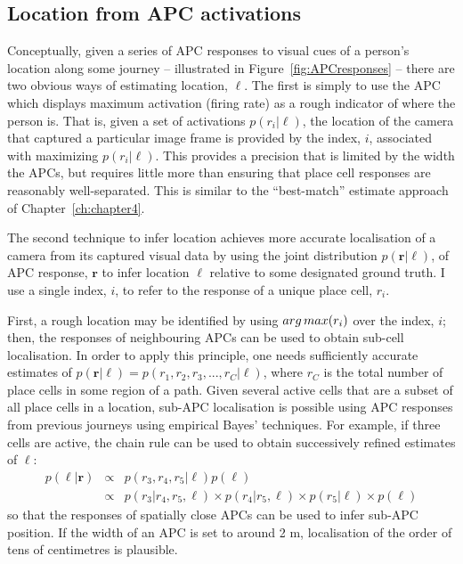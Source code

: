 \subsection{Location from APC activations}
Conceptually, given a series of APC responses to visual cues of a person's location along some journey -- illustrated in Figure~\ref{fig:APCresponses} -- there are two obvious ways of estimating location, $\ell$.  The first is simply to use the APC which displays maximum activation (firing rate) as a rough indicator of where the person is. That is, given a set of activations $p(r_i|\ell)$, the location of the camera that captured a particular image frame is provided by the index, $i$, associated with maximizing $p(r_i|\ell)$. This provides a precision that is limited by the width the APCs, but requires little more than ensuring that place cell responses are reasonably well-separated. This is similar to the ``best-match'' estimate approach of Chapter~\ref{ch:chapter4}.

The second technique to infer location achieves more accurate localisation of a camera from its captured visual data by using the joint distribution $p(\mathbf{r}|\ell)$, of APC response, $\mathbf{r}$ to infer location $\ell$ relative to some designated ground truth.  I use a single index, $i$, to refer to the response of a unique place cell, $r_i$.

 First, a rough location may be identified by using $arg\,max(r_i)$ over the index, $i$; then, the responses of neighbouring APCs can be used to obtain sub-cell localisation.  In order to apply this principle, one needs sufficiently accurate estimates of $p(\mathbf{r}|\ell) = p(r_1,r_2,r_3,...,r_C|\ell)$, where $r_C$ is the total number of place cells in some region of a path.   Given several active cells that are a subset of all place cells in a location, sub-APC localisation is possible using APC responses from previous journeys using empirical Bayes' techniques. For example, if three cells are active, the chain rule can be used to obtain successively refined estimates of $\ell$:
\begin{eqnarray}
p(\ell|\mathbf{r}) & \propto & p(r_3,r_4,r_5|\ell)p(\ell) \nonumber \\
&\propto& p(r_3|r_4,r_5,\ell)\times p(r_4|r_5,\ell)\times p(r_5|\ell)\times p(\ell)
\end{eqnarray}
 so that the responses of spatially close APCs can be used to infer sub-APC position.  If the width of an APC is set to around 2 m, localisation of the order of tens of centimetres is plausible. 


